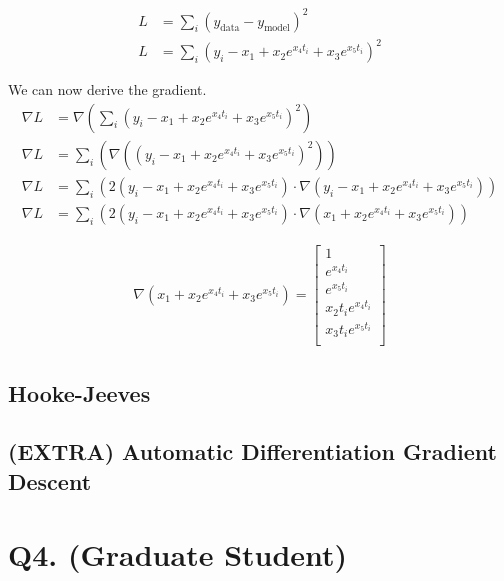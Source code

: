 \documentclass{article}
\begin{document}
    \begin{align}
    L &= \sum_i (y_{\text{data}} - y_{\text{model}})^2 \\
    L &= \sum_i (y_{i} - x_1 + x_2 e ^ {x_4 t_i} + x_3 e ^{x_5 t_i})^2
    \end{align}

    We can now derive the gradient.
    \begin{align}
    \nabla L &= \nabla \left( \sum_i (y_{i} - x_1 + x_2 e ^ {x_4 t_i} + x_3 e ^{x_5 t_i})^2 \right) \\
    \nabla L &= \sum_i \left( \nabla \left( (y_{i} - x_1 + x_2 e ^ {x_4 t_i} + x_3 e ^{x_5 t_i})^2 \right) \right) \\
    \nabla L &= \sum_i \left( 2(y_{i} - x_1 + x_2 e ^ {x_4 t_i} + x_3 e ^{x_5 t_i}) \cdot \nabla (y_{i} - x_1 + x_2 e ^ {x_4 t_i} + x_3 e ^{x_5 t_i}) \right) \\
    \nabla L &= \sum_i \left( 2(y_{i} - x_1 + x_2 e ^ {x_4 t_i} + x_3 e ^{x_5 t_i}) \cdot \nabla (x_1 + x_2 e ^ {x_4 t_i} + x_3 e ^{x_5 t_i}) \right)
    \end{align}

    \begin{align}
        \nabla (x_1 + x_2 e ^ {x_4 t_i} + x_3 e ^{x_5 t_i}) = 
            \begin{bmatrix}
                1 \\
                e ^ {x_4 t_i} \\
                e ^ {x_5 t_i} \\
                x_2 t_i e ^ {x_4 t_i} \\
                x_3 t_i e ^{x_5 t_i} \\
            \end{bmatrix}
    \end{align}

    \subsection{Hooke-Jeeves}

    \subsection{(EXTRA) Automatic Differentiation Gradient Descent}

    \section{Q4. (Graduate Student)}
\end{document}
